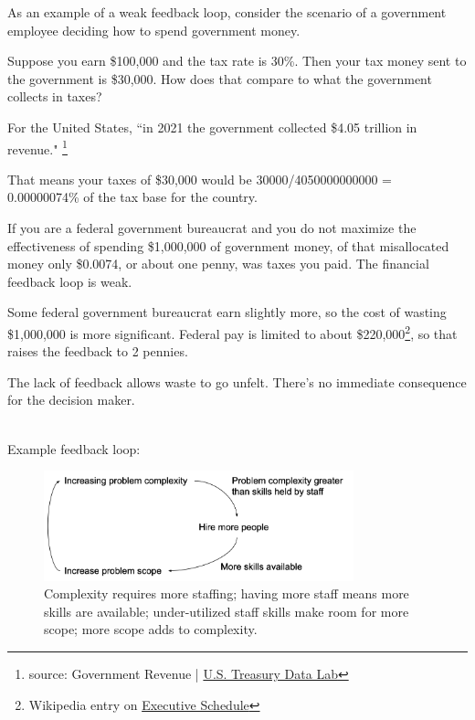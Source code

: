 As an example of a weak feedback loop, consider the scenario of a government employee deciding how to spend government money.

\begin{mdframed}
Suppose you earn \$100,000 and the tax rate is 30\%. Then your tax money sent to the government is \$30,000.
How does that compare to what the government collects in taxes?

For the United States, ``in 2021 the government collected \$4.05 trillion in revenue."
\footnote{source: Government Revenue | \href{https://datalab.usaspending.gov/americas-finance-guide/revenue/}{U.S. Treasury Data Lab}}

That means your taxes of \$30,000 would be
30000/4050000000000 = 0.00000074\% of the tax base for the country.

If you are a federal government bureaucrat and you do not maximize the effectiveness of spending \$1,000,000 of government money, of that misallocated money only \$0.0074, or about one penny, was taxes you paid. The financial feedback loop is weak.

Some federal government bureaucrat earn slightly more, so the cost of wasting \$1,000,000 is more significant.
Federal pay is limited to about \$220,000\footnote{Wikipedia entry on \href{https://en.wikipedia.org/wiki/Executive\_Schedule}{Executive Schedule}}, so that raises the feedback to 2 pennies.
\end{mdframed}

The lack of feedback allows waste to go unfelt. There's no immediate consequence for the decision maker.

\ \\

Example feedback loop:
\begin{center}
\begin{figure}[ht]
    \centering
    \includegraphics[width=0.8\textwidth]{images/feedback_loop_complexity_and_staffing}
    \caption{Complexity requires more staffing; having more staff means more skills are available; under-utilized staff skills make room for more scope; more scope adds to complexity.}
    \label{fig:complexity_and_staff_growth}
\end{figure}
\end{center}

